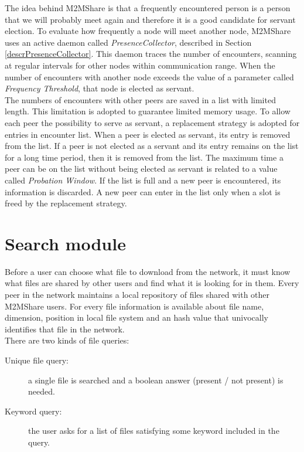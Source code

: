 The idea behind M2MShare is that a frequently encountered person is a person that we will probably meet again and therefore it is a good candidate for servant election. To evaluate how frequently a node will meet another node, M2MShare uses an active daemon called \textit{PresenceCollector}, described in Section \ref{descrPresenceCollector}. This daemon traces the number of encounters, scanning at regular intervals for other nodes within communication range. When the number of encounters with another node exceeds the value of a parameter called \textit{Frequency Threshold}, that node is elected as servant.
\\

The numbers of encounters with other peers are saved in a list with limited length. This limitation is adopted to guarantee limited memory usage. To allow each peer the possibility to serve as servant, a replacement strategy is adopted for entries in encounter list. When a peer is elected as servant, its entry is removed from the list. If a peer is not elected as a servant and its entry remains on the list for a long time period, then it is removed from the list. The maximum time a peer can be on the list without being elected as servant is related to a value called \textit{Probation Window}. If the list is full and a new peer is encountered, its information is discarded. A new peer can enter in the list only when a slot is freed by the replacement strategy.

\section{Search module}
Before a user can choose what file to download from the network, it must know what files are shared by other users and find what it is looking for in them. Every peer in the network maintains a local repository of files shared with other M2MShare users. For every file information is available about file name, dimension, position in local file system and an hash value that univocally identifies that file in the network.
\\

There are two kinds of file queries: 

\begin{description}
\item[Unique file query:] a single file is searched and a boolean answer (present / not present) is needed.
\item[Keyword query:] the user asks for a list of files satisfying some keyword included in the query.
\end{description}

